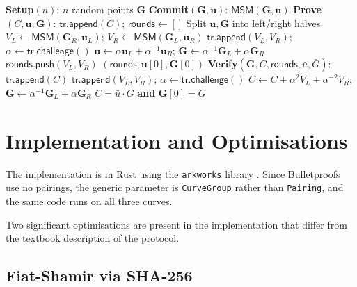 \begin{algorithm}[H]
\caption{Bulletproofs Setup, Commit, Prove, Verify}
\label{alg:bp-all}
\begin{algorithmic}[1]
\Statex \textbf{Setup}$(n)$: \Return $n$ random points $\mathbf{G}$
\Statex \textbf{Commit}$(\mathbf{G}, \mathbf{u})$:
    \Return $\mathsf{MSM}(\mathbf{G}, \mathbf{u})$
\Statex
\Statex \textbf{Prove}$(C, \mathbf{u}, \mathbf{G})$:
\State $\mathsf{tr}.\mathsf{append}(C)$;\; $\mathsf{rounds} \gets []$
    \State Split $\mathbf{u}, \mathbf{G}$ into left/right halves
    \State $V_L \gets \mathsf{MSM}(\mathbf{G}_R, \mathbf{u}_L)$;\;
           $V_R \gets \mathsf{MSM}(\mathbf{G}_L, \mathbf{u}_R)$
    \State $\mathsf{tr}.\mathsf{append}(V_L, V_R)$;\;
           $\alpha \gets \mathsf{tr}.\mathsf{challenge}()$
    \State $\mathbf{u} \gets \alpha\mathbf{u}_L + \alpha^{-1}\mathbf{u}_R$;\;
           $\mathbf{G} \gets \alpha^{-1}\mathbf{G}_L + \alpha\mathbf{G}_R$
    \State $\mathsf{rounds}.\mathsf{push}(V_L, V_R)$
\EndWhile
\State \Return $(\mathsf{rounds}, \mathbf{u}[0], \mathbf{G}[0])$
\Statex
\Statex \textbf{Verify}$(\mathbf{G}, C, \mathsf{rounds}, \bar{u}, \bar{G})$:
\State $\mathsf{tr}.\mathsf{append}(C)$
    \State $\mathsf{tr}.\mathsf{append}(V_L, V_R)$;\;
           $\alpha \gets \mathsf{tr}.\mathsf{challenge}()$
    \State $C \gets C + \alpha^2 V_L + \alpha^{-2} V_R$;\;
           $\mathbf{G} \gets \alpha^{-1}\mathbf{G}_L + \alpha\mathbf{G}_R$
\EndFor
\State \Return $C = \bar{u} \cdot \bar{G}$ \textbf{and} $\mathbf{G}[0] = \bar{G}$
\end{algorithmic}
\end{algorithm}

\section{Implementation and Optimisations}

The implementation is in Rust using the \texttt{arkworks} library
\cite{arkworks}. Since Bulletproofs use no pairings, the generic
parameter is \texttt{CurveGroup} rather than \texttt{Pairing}, and
the same code runs on all three curves.

Two significant optimisations are present in the implementation that
differ from the textbook description of the protocol.

\subsection{Fiat-Shamir via SHA-256}

